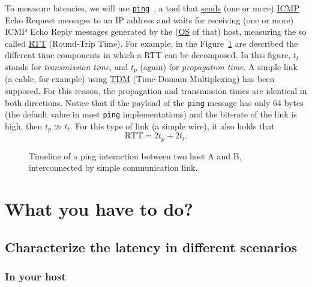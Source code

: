 To mesasure latencies, we will use
\href{https://github.com/torvalds/linux/blob/master/net/ipv4/ping.c}{\texttt{ping}}~\cite{Kurose-Ross,Forouzan},
a tool that
\href{https://en.wikipedia.org/wiki/Ping_(networking_utility)}{sends}
(one or more)
\href{https://en.wikipedia.org/wiki/Internet_Control_Message_Protocol}{ICMP}
Echo Request messages to an IP address and waits for receiving (one or
more) ICMP Echo Reply messages generated by the
(\href{https://en.wikipedia.org/wiki/Operating_system}{OS} of that)
host, measuring the so called
\href{https://en.wikipedia.org/wiki/Round-trip_delay}{RTT} (Round-Trip
Time). For example, in the Figure~\ref{fig:ping_timeline} are
described the different time components in which a RTT can be
decomposed. In this figure, $t_t$ stands for \emph{transmission time},
and $t_p$ (again) for \emph{propagation time}. A simple link (a cable,
for example) using
\href{https://en.wikipedia.org/wiki/Time-division_multiple_access}{TDM}
(Time-Domain Multiplexing) has been supposed. For this reason, the
propagation and transmission times are identical in both
directions. Notice that if the payload of the \verb|ping| message has
only 64 bytes (the default value in most \verb|ping| implementations)
and the bit-rate of the link is high, then $t_p\gg t_t.$ For this type
of link (a simple wire), it also holds that
\begin{equation}
  \text{RTT} = 2t_p + 2t_t.
  \label{eq:RTT}
\end{equation}
  
\begin{figure}
  \begin{center}
  \end{center}
  \caption{Timeline of a ping interaction between two host A and B,
    interconnected by simple communication link.}
  \label{fig:ping_timeline}
\end{figure}

\section{What you have to do?}

\subsection{Characterize the latency in different scenarios}

\subsubsection{In your host}

